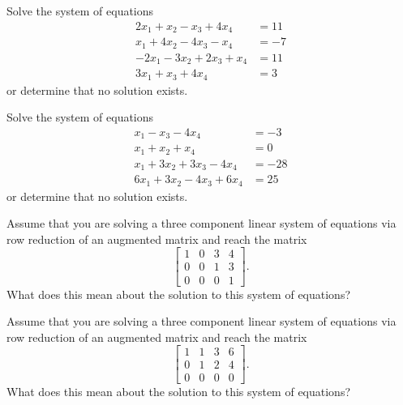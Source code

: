 \begin{exercise}\ansMark%
Solve the system of equations
\begin{equation*}
\begin{split}
2x_1 + x_2 - x_3 + 4x_4 &= 11 \\
x_1 + 4x_2  - 4x_3 - x_4 &= -7 \\
-2x_1 - 3x_2 + 2x_3 + x_4 &= 11 \\
3x_1 + x_3  + 4x_4 &= 3
\end{split}
\end{equation*}
or determine that no solution exists. 
\end{exercise}
%

\begin{exercise}\ansMark%
Solve the system of equations
\begin{equation*}
\begin{split}
x_1 - x_3 - 4x_4 &= -3 \\
x_1 + x_2 + x_4 &= 0\\
x_1 + 3x_2 + 3x_3 - 4x_4 &= -28 \\
6x_1 + 3x_2 - 4x_3 + 6x_4 &= 25
\end{split}
\end{equation*}
or determine that no solution exists. 
\end{exercise}
%

\begin{exercise}\ansMark%
Assume that you are solving a three component linear system of equations via row reduction of an augmented matrix and reach the matrix
\begin{equation*}
\left[ 
\begin{array}{ccc|c}
1 & 0 & 3 & 4 \\
0 & 0 & 1 & 3 \\
0 & 0 & 0 & 1
\end{array}
\right].
\end{equation*}
What does this mean about the solution to this system of equations?
\end{exercise}

\begin{exercise}\ansMark%
Assume that you are solving a three component linear system of equations via row reduction of an augmented matrix and reach the matrix
\begin{equation*}
\left[ 
\begin{array}{ccc|c}
1 & 1 & 3 & 6 \\
0 & 1 & 2 & 4 \\
0 & 0 & 0 & 0
\end{array}
\right].
\end{equation*}
What does this mean about the solution to this system of equations?
\end{exercise}

